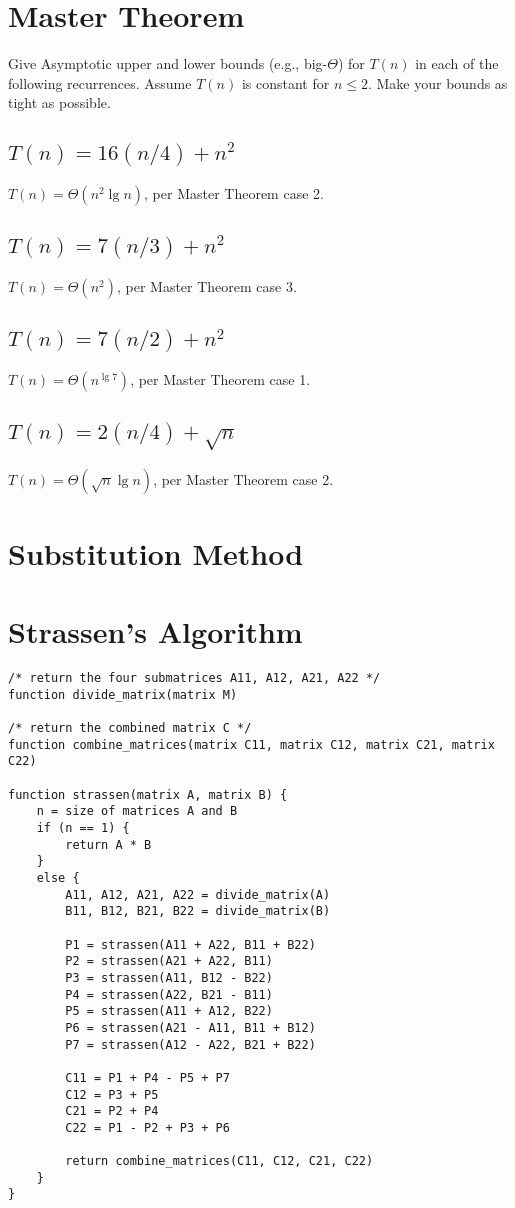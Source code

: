 
\section{Master Theorem}
Give Asymptotic upper and lower bounds (e.g., big-$\Theta$) for $T(n)$ in each of the following recurrences. Assume $T(n)$ is constant for $n \leq 2$. Make your bounds as tight as possible.
\subsection{$T(n) = 16(n/4) + n^2$}
$T(n) = \Theta \left( n^2\lg n  \right)$, per Master Theorem case 2.

\subsection{$T(n) = 7(n/3) + n^2$}
$T(n) = \Theta \left( n^2 \right)$, per Master Theorem case 3.

\subsection{$T(n) = 7(n/2) + n^2$}
$T(n) = \Theta \left( n^{\lg 7} \right)$, per Master Theorem case 1.

\subsection{$T(n) = 2(n/4) + \sqrt{n}$}
$T(n) = \Theta \left( \sqrt{n} \lg n \right)$, per Master Theorem case 2.


\section{Substitution Method}

\section{Strassen's Algorithm}
\begin{lstlisting}[style=txt]
/* return the four submatrices A11, A12, A21, A22 */
function divide_matrix(matrix M)

/* return the combined matrix C */
function combine_matrices(matrix C11, matrix C12, matrix C21, matrix C22)

function strassen(matrix A, matrix B) {
	n = size of matrices A and B
	if (n == 1) {
		return A * B
	}
	else {
		A11, A12, A21, A22 = divide_matrix(A)
		B11, B12, B21, B22 = divide_matrix(B)

		P1 = strassen(A11 + A22, B11 + B22)
		P2 = strassen(A21 + A22, B11)
		P3 = strassen(A11, B12 - B22)
		P4 = strassen(A22, B21 - B11)
		P5 = strassen(A11 + A12, B22)
		P6 = strassen(A21 - A11, B11 + B12)
		P7 = strassen(A12 - A22, B21 + B22)

		C11 = P1 + P4 - P5 + P7
		C12 = P3 + P5
		C21 = P2 + P4
		C22 = P1 - P2 + P3 + P6

		return combine_matrices(C11, C12, C21, C22)
	}
}
\end{lstlisting}


